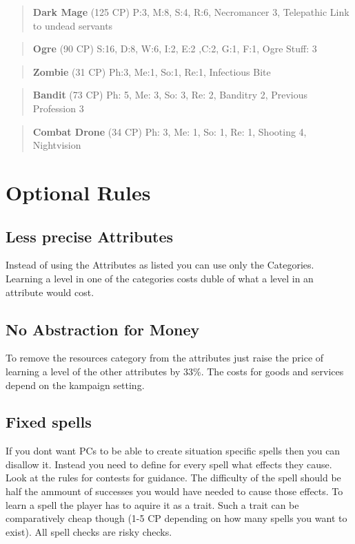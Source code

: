\documentclass[11pt]{article}
\begin{document}
{\begin{multicols}{2}[]
\begin{quote}
\textbf{Dark Mage} (125 CP)
P:3, M:8, S:4, R:6, Necromancer 3, Telepathic Link to undead servants
\end{quote}

\begin{quote}
\textbf{Ogre} (90 CP)
S:16, D:8, W:6, I:2, E:2 ,C:2, G:1, F:1, Ogre Stuff: 3
\end{quote}

\begin{quote}
\textbf{Zombie} (31 CP)
Ph:3, Me:1, So:1, Re:1, Infectious Bite
\end{quote}

\begin{quote}
\textbf{Bandit} (73 CP)
Ph: 5, Me: 3, So: 3, Re: 2, Banditry 2, Previous Profession 3
\end{quote}

\begin{quote}
\textbf{Combat Drone} (34 CP)
Ph: 3, Me: 1, So: 1, Re: 1, Shooting 4, Nightvision
\end{quote}



\newpage
\section{Optional Rules}
\label{sec:org7c24d94}

\subsection{Less precise Attributes}
\label{sec:orgdb02c8e}
Instead of using the Attributes as listed you can use only the Categories. Learning a level in one of the categories costs duble of what a level in an attribute would cost.

\subsection{No Abstraction for Money}
\label{sec:orgccbe543}
To remove the resources category from the attributes just raise the price of learning a level of the other attributes by 33\%. The costs for goods and services depend on the kampaign setting.

\subsection{Fixed spells}
\label{sec:orgddac17a}
If you dont want PCs to be able to create situation specific spells then you can disallow it. Instead you need to define for every spell what effects they cause. Look at the rules for contests for guidance. The difficulty of the spell should be half the ammount of successes you would have needed to cause those effects. To learn a spell the player has to aquire it as a trait. Such a trait can be comparatively cheap though (1-5 CP depending on how many spells you want to exist). All spell checks are risky checks.


\end{multicols}}
\end{document}
